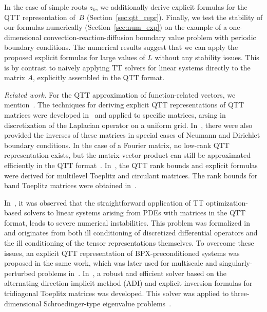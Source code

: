 \documentclass[a4paper]{article}
\begin{document}
In the case of simple roots $z_k$, we additionally derive explicit formulas for the QTT representation of~$B$ (Section~\ref{sec:qtt_repr}). 
Finally, we test the stability of our formulas numerically (Section~\ref{sec:num_exp}) on the example of a one-dimensional convection-reaction-diffusion boundary value problem with periodic boundary conditions.
The numerical results suggest that we can apply the proposed explicit formulas for large values of $L$ without any stability issues.
This is by contrast to naively applying TT solvers for linear systems directly to the matrix $A$, explicitly assembled in the QTT format.


\emph{Related work.} For the QTT approximation of function-related vectors, we mention~\cite{khor-qtt-2011,dk-qtt-tucker-2013,gras-tenz-2010,vysotsky2021tt}. 
The techniques for deriving explicit QTT representations of QTT matrices were developed in~\cite{khkaz-lap-2012} and applied to specific matrices, arsing in discretization of the Laplacian operator on a uniform grid.
In~\cite{khkaz-lap-2012}, there were also provided the inverses of these matrices in special cases of Neumann and Dirichlet boundary conditions.
In the case of a Fourier matrix, no low-rank QTT representation exists, but the matrix-vector product can still be approximated efficiently in the QTT format~\cite{dks-ttfft-2012}.
In~\cite{khkaz-conv-2013}, the QTT rank bounds and explicit formulas were derived for multilevel Toeplitz and circulant matrices.
The rank bounds for band Toeplitz matrices were obtained in~\cite{otz-teninv-2011}. 

In~\cite{cor-eccomas-2016,kazeev2018quantized,cor-robqtt-2016pre}, it was observed that the straightforward application of TT optimization-based solvers to linear systems arising from PDEs with matrices in the QTT format, leads to severe numerical instabilities.
This problem was formalized in~\cite{bachmayr2018stability} and originates from both ill conditioning of discretized differential operators and the ill conditioning of the tensor representations themselves.
To overcome these issues, an explicit QTT representation of BPX-preconditioned systems was proposed in the same work, which was later used for multiscale and singularly-perturbed problems in~\cite{kazeev2020quantized,marcati2020low}.
In~\cite{rakhuba2021robust}, a robust and efficient solver based on the alternating direction implicit method (ADI) and explicit inversion formulas for tridiagonal Toeplitz matrices was developed.
This solver was applied to three-dimensional Schroedinger-type eigenvalue problems~\cite{marcati2019tensor}.
\end{document}
